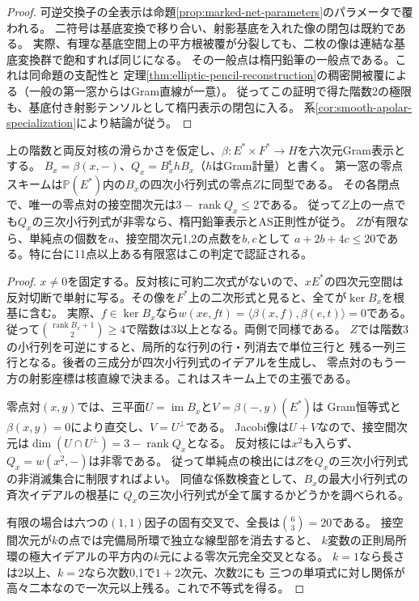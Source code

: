 \begin{proof}
可逆交換子の全表示は命題\ref{prop:marked-net-parameters}のパラメータで覆われる。
二符号は基底変換で移り合い、射影基底を入れた像の閉包は既約である。
実際、有理な基底空間上の平方根被覆が分裂しても、二枚の像は連結な基底変換群で飽和すれば同じになる。
その一般点は楕円鉛筆の一般点である。これは同命題の支配性と
定理\ref{thm:elliptic-pencil-reconstruction}の稠密開被覆による（一般の第一窓からはGram直線が一意）。
従ってこの証明で得た階数2の極限も、基底付き射影テンソルとして楕円表示の閉包に入る。
系\ref{cor:smooth-apolar-specialization}により結論が従う。
\end{proof}

\begin{proposition}[片側の小行列式による単純零点の検査]\label{prop:smooth-apolar-defect}
上の階数と両反対核の滑らかさを仮定し、$\beta:E^*\times F^*\to H$を六次元Gram表示とする。
$B_x=\beta(x,-)$、$Q_x=B_x^{\mathsf t}h B_x$（$h$はGram計量）と書く。
第一窓の零点スキームは$\mathbb P(E^*)$内の$B_x$の四次小行列式の零点$Z$に同型である。
その各閉点で、唯一の零点対の接空間次元は$3-\operatorname{rank}Q_x\le2$である。
従って$Z$上の一点でも$Q_x$の三次小行列式が非零なら、楕円鉛筆表示とAS正則性が従う。
$Z$が有限なら、単純点の個数を$a$、接空間次元1,2の点数を$b,c$として
$a+2b+4c\le20$である。特に台に11点以上ある有限窓はこの判定で認証される。
\end{proposition}
\begin{proof}
$x\ne0$を固定する。反対核に可約二次式がないので、$x E^*$の四次元空間は
反対切断で単射に写る。その像を$F^*$上の二次形式と見ると、全てが$\ker B_x$を根基に含む。
実際、$f\in\ker B_x$なら$w(xe,ft)=\langle\beta(x,f),\beta(e,t)\rangle=0$である。
従って$\binom{\operatorname{rank}B_x+1}{2}\ge4$で階数は3以上となる。両側で同様である。
$Z$では階数3の小行列を可逆にすると、局所的な行列の行・列消去で単位三行と
残る一列三行となる。後者の三成分が四次小行列式のイデアルを生成し、
零点対のもう一方の射影座標は核直線で決まる。これはスキーム上での主張である。

零点対$(x,y)$では、三平面$U=\operatorname{im}B_x$と$V=\beta(-,y)(E^*)$は
Gram恒等式と$\beta(x,y)=0$により直交し、$V=U^\perp$である。
Jacobi像は$U+V$なので、接空間次元は$\dim(U\cap U^\perp)=3-\operatorname{rank}Q_x$となる。
反対核には$x^2$も入らず、$Q_x=w(x^2,-)$は非零である。
従って単純点の検出には$Z$を$Q_x$の三次小行列式の非消滅集合に制限すればよい。
同値な係数検査として、$B_x$の最大小行列式の斉次イデアルの根基に
$Q_x$の三次小行列式が全て属するかどうかを調べられる。

有限の場合は六つの$(1,1)$因子の固有交叉で、全長は$\binom63=20$である。
接空間次元が$k$の点では完備局所環で独立な線型部を消去すると、
$k$変数の正則局所環の極大イデアルの平方内の$k$元による零次元完全交叉となる。
$k=1$なら長さは2以上、$k=2$なら次数0,1で$1+2$次元、次数2にも
三つの単項式に対し関係が高々二本なので一次元以上残る。これで不等式を得る。
\end{proof}
